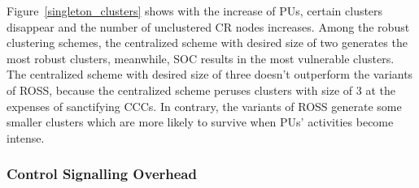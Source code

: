 \documentclass[10pt,journal,compsoc]{IEEEtran}
\theoremstyle{mytheoremstyle}
\theoremstyle{mytheoremstyle}
\theoremstyle{mytheoremstyle}
\begin{document}
Figure~\ref{singleton_clusters} shows with the increase of PUs, certain clusters disappear and the number of unclustered CR nodes increases.
Among the robust clustering schemes, the centralized scheme with desired size of two generates the most robust clusters, meanwhile, SOC results in the most vulnerable clusters.
The centralized scheme with desired size of three doesn't outperform the variants of ROSS, because the centralized scheme peruses clusters with size of 3 at the expenses of sanctifying CCCs.
In contrary, the variants of ROSS generate some smaller clusters which are more likely to survive when PUs' activities become intense.




%
%



\subsubsection{Control Signalling Overhead}
\end{document}
